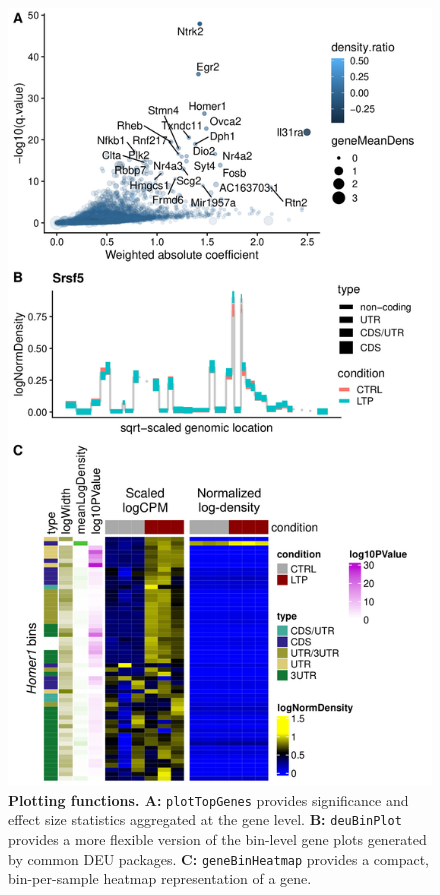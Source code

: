 \documentclass{bmcart}
\begin{document}
\begin{figure}
\includegraphics[height=0.6\textheight]{examples.png}
\caption{\textbf{Plotting functions. A:} \texttt{plotTopGenes} provides significance and effect size statistics aggregated at the gene level. \textbf{B:} \texttt{deuBinPlot} provides a more flexible version of the bin-level gene plots generated by common DEU packages. \textbf{C:} \texttt{geneBinHeatmap} provides a compact, bin-per-sample heatmap representation of a gene.}
\label{fig:plots}
\end{figure}
\end{document}

